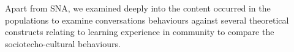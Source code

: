 \documentclass[format=acmsmall, review=false, screen=true]{acmart}
\newcommand{\msb}[1]{{\textcolor{blue}{ [Michael: #1]}}}
\newcommand{\dil}[1]{{\textcolor{magenta}{ Dilrukshi: #1]}}}
\begin{document}
Apart from SNA, we examined deeply into the content occurred in the populations to examine conversations behaviours against several theoretical constructs relating to learning experience in community to compare the sociotecho-cultural behaviours.


\end{document}
